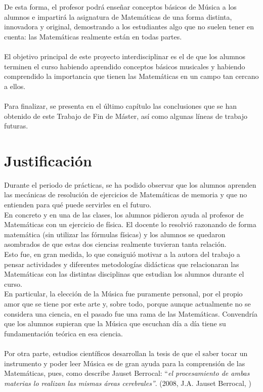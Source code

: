 \documentclass[a4paper, openright, 11pt, titlepage]{report}
\theoremstyle{definition}\newtheorem{defin}[propo]{Definition}
\theoremstyle{definition}\newtheorem{obser}[propo]{Remark}
\theoremstyle{definition}\newtheorem{ejem}[propo]{Ejemplo}
\theoremstyle{definition}\newtheorem{algoritmo}[propo]{Algoritmo}
\begin{document}
De esta forma, el profesor podrá enseñar conceptos básicos de Música a los alumnos e impartirá la asignatura de Matemáticas de una forma distinta, innovadora y original, demostrando a los estudiantes algo que no suelen tener en cuenta: las Matemáticas realmente están en todas partes.\\\\
El objetivo principal de este proyecto interdisciplinar es el de que los alumnos terminen el curso habiendo aprendido conceptos básicos musicales y habiendo comprendido la importancia que tienen las Matemáticas en un campo tan cercano a ellos.\\\\
Para finalizar, se presenta en el último capítulo las conclusiones que se han obtenido de este Trabajo de Fin de Máster, así como algunas líneas de trabajo futuras.
\section{Justificación}
Durante el periodo de prácticas, se ha podido observar que los alumnos aprenden las mecánicas de resolución de ejercicios de Matemáticas de memoria y que no entienden para qué puede servirles en el futuro.\\
En concreto y en una de las clases, los alumnos pidieron ayuda al profesor de Matemáticas con un ejercicio de física. El docente lo resolvió razonando de forma matemática (sin utilizar las fórmulas físicas) y los alumnos se quedaron asombrados de que estas dos ciencias realmente tuvieran tanta relación.\\
Esto fue, en gran medida, lo que consiguió motivar a la autora del trabajo a pensar actividades y diferentes metodologías didácticas que relacionaran las Matemáticas con las distintas disciplinas que estudian los alumnos durante el curso.\\
En particular, la elección de la Música fue puramente personal, por el propio amor que se tiene por este arte y, sobre todo, porque aunque actualmente no se considera una ciencia, en el pasado fue una rama de las Matemáticas. Convendría que los alumnos supieran que la Música que escuchan día a día tiene su fundamentación teórica en esa ciencia.\\\\
Por otra parte, estudios científicos desarrollan la tesis de que el saber tocar un instrumento y poder leer Música es de gran ayuda para la comprensión de las Matemáticas, pues, como describe Jauset Berrocal: ``\textit{el procesamiento de ambas materias lo realizan las mismas áreas cerebrales''}. (2008, J.A. Jauset Berrocal, \cite{berrocal})
 
\end{document}
